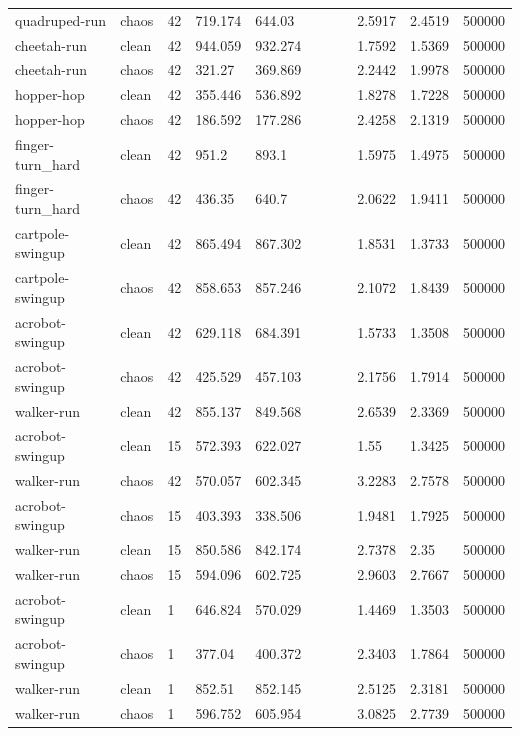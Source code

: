 \begin{tabular}{lllllllllll}
quadruped-run & chaos & 42 & 719.174 & 644.03 &  &  &  & 2.5917 & 2.4519 & 500000 \\
cheetah-run & clean & 42 & 944.059 & 932.274 &  &  &  & 1.7592 & 1.5369 & 500000 \\
cheetah-run & chaos & 42 & 321.27 & 369.869 &  &  &  & 2.2442 & 1.9978 & 500000 \\
hopper-hop & clean & 42 & 355.446 & 536.892 &  &  &  & 1.8278 & 1.7228 & 500000 \\
hopper-hop & chaos & 42 & 186.592 & 177.286 &  &  &  & 2.4258 & 2.1319 & 500000 \\
finger-turn\_hard & clean & 42 & 951.2 & 893.1 &  &  &  & 1.5975 & 1.4975 & 500000 \\
finger-turn\_hard & chaos & 42 & 436.35 & 640.7 &  &  &  & 2.0622 & 1.9411 & 500000 \\
cartpole-swingup & clean & 42 & 865.494 & 867.302 &  &  &  & 1.8531 & 1.3733 & 500000 \\
cartpole-swingup & chaos & 42 & 858.653 & 857.246 &  &  &  & 2.1072 & 1.8439 & 500000 \\
acrobot-swingup & clean & 42 & 629.118 & 684.391 &  &  &  & 1.5733 & 1.3508 & 500000 \\
acrobot-swingup & chaos & 42 & 425.529 & 457.103 &  &  &  & 2.1756 & 1.7914 & 500000 \\
walker-run & clean & 42 & 855.137 & 849.568 &  &  &  & 2.6539 & 2.3369 & 500000 \\
acrobot-swingup & clean & 15 & 572.393 & 622.027 &  &  &  & 1.55 & 1.3425 & 500000 \\
walker-run & chaos & 42 & 570.057 & 602.345 &  &  &  & 3.2283 & 2.7578 & 500000 \\
acrobot-swingup & chaos & 15 & 403.393 & 338.506 &  &  &  & 1.9481 & 1.7925 & 500000 \\
walker-run & clean & 15 & 850.586 & 842.174 &  &  &  & 2.7378 & 2.35 & 500000 \\
walker-run & chaos & 15 & 594.096 & 602.725 &  &  &  & 2.9603 & 2.7667 & 500000 \\
acrobot-swingup & clean & 1 & 646.824 & 570.029 &  &  &  & 1.4469 & 1.3503 & 500000 \\
acrobot-swingup & chaos & 1 & 377.04 & 400.372 &  &  &  & 2.3403 & 1.7864 & 500000 \\
walker-run & clean & 1 & 852.51 & 852.145 &  &  &  & 2.5125 & 2.3181 & 500000 \\
walker-run & chaos & 1 & 596.752 & 605.954 &  &  &  & 3.0825 & 2.7739 & 500000 \\

\end{tabular}
